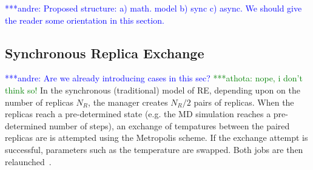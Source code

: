 \documentclass{rspublic}
\newcommand{\jhanote}[1]{ {\textcolor{red} { ***shantenu: #1 }}}
\newcommand{\alnote}[1]{ {\textcolor{blue} { ***andre: #1 }}}
\newcommand{\athotanote}[1]{ {\textcolor{green} { ***athota: #1 }}}
\newcommand{\alnote}[1]{}
\newcommand{\athotanote}[1]{}
\newcommand{\jhanote}[1]{}
\begin{document}



\alnote{Proposed structure: a) math. model b) sync c) async. We should give the reader some orientation in this section.}

\subsection{Synchronous Replica Exchange}

\alnote{Are we already introducing cases in this sec?}
\athotanote{nope, i don't think so!}  In the synchronous (traditional)
model of RE, depending upon on the number of replicas ${N_R}$, the
manager creates ${N_R/2}$ pairs of replicas. When the replicas reach a
pre-determined state (e.g. the MD simulation reaches a pre-determined
number of steps), %
an exchange of tempatures between the paired replicas are is attempted
using the Metropolis scheme. %
If the exchange attempt is successful, parameters such as the
temperature are swapped. Both jobs are then
relaunched~\citep{Luckow:2008fp}.
\end{document}
